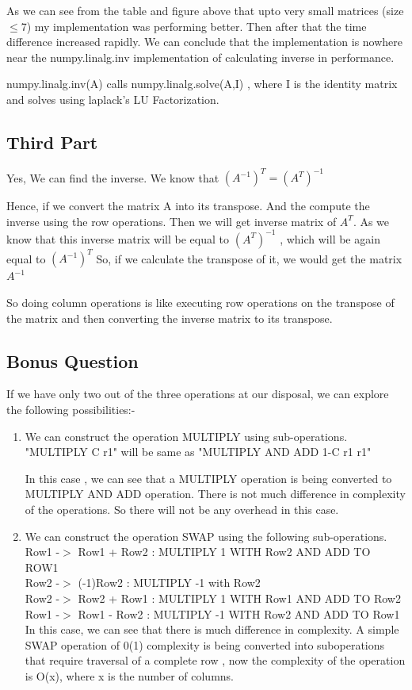 \documentclass[runningheads]{llncs}
\begin{document}
As we can see from the table and figure above that upto very small matrices (size $\leq$7) my implementation was performing better. Then after that the time difference increased rapidly. We can conclude that the implementation is nowhere near the numpy.linalg.inv implementation of calculating inverse in performance. 

numpy.linalg.inv(A) calls numpy.linalg.solve(A,I) , where I is the identity matrix and solves using laplack's LU Factorization.~\cite{ref_proc1}

\subsection{Third Part}
Yes, We can find the inverse. We know that $(A^{-1})^T = (A^T)^{-1}$ 

Hence, if we convert the matrix A into its transpose. And the compute the inverse using the row operations. Then we will get inverse matrix of $A^T$.
As we know that this inverse matrix will be equal to $(A^{T})^{-1}$ , which will be again equal to $(A^{-1})^T$
So, if we calculate the transpose of it, we would get the matrix $A^{-1}$

So doing column operations is like executing row operations on the transpose of the matrix and then converting the inverse matrix to its transpose. 


\subsection{Bonus Question}
If we have only two out of the three operations at our disposal, we can explore the following possibilities:-
\begin{enumerate}
\item
We can construct the operation MULTIPLY using sub-operations.\\
"MULTIPLY C r1" will be same as "MULTIPLY AND ADD 1-C r1 r1"

In this case , we can see that a MULTIPLY operation is being converted to MULTIPLY AND ADD operation. There is not much difference in complexity of the operations. So there will not be any overhead in this case. 

\item
We can construct the operation SWAP using the following sub-operations.\\
Row1 -$>$ Row1 + Row2 : MULTIPLY 1 WITH Row2 AND ADD TO ROW1\\
Row2 -$>$ (-1)Row2 : MULTIPLY -1 with Row2 \\
Row2 -$>$ Row2 + Row1 : MULTIPLY 1 WITH Row1 AND ADD TO Row2\\
Row1 -$>$ Row1 - Row2 : MULTIPLY -1 WITH Row2 AND ADD TO Row1\\

In this case, we can see that there is much difference in complexity. A simple SWAP operation of 0(1) complexity is being converted into suboperations that require traversal of a complete row , now the complexity of the operation is O(x), where x is the number of columns. 

\end{enumerate}
\end{document}
